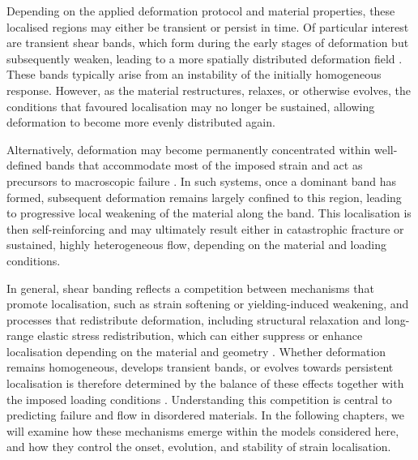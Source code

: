 Depending on the applied deformation protocol and material properties, these localised regions may either be transient or persist in time. Of particular interest are transient shear bands, which form during the early stages of deformation but subsequently weaken, leading to a more spatially distributed deformation field \cite{moorcroft_age-dependent_2011,barlow_ductile_2020,divouxTransientShearBanding2010,adams_transient_2011}. These bands typically arise from an instability of the initially homogeneous response. However, as the material restructures, relaxes, or otherwise evolves, the conditions that favoured localisation may no longer be sustained, allowing deformation to become more evenly distributed again.

Alternatively, deformation may become permanently concentrated within well-defined bands that accommodate most of the imposed strain and act as precursors to macroscopic failure \cite{greer_shear_2013,hufnagel_deformation_2016,nicolas_deformation_2018,Falk2003,maloney_amorphous_2006,Shi2007,falk_deformation_2011,Barrat2011}. In such systems, once a dominant band has formed, subsequent deformation remains largely confined to this region, leading to progressive local weakening of the material along the band. This localisation is then self-reinforcing and may ultimately result either in catastrophic fracture or sustained, highly heterogeneous flow, depending on the material and loading conditions.

In general, shear banding reflects a competition between mechanisms that promote localisation, such as strain softening or yielding-induced weakening, and processes that redistribute deformation, including structural relaxation and long-range elastic stress redistribution, which can either suppress or enhance localisation depending on the material and geometry \cite{fielding_shear_2014,divouxShearBandingComplex2016,martens_spontaneous_2012,moorcroft_criteria_2013,moorcroft_age-dependent_2011,nicolas_deformation_2018}. Whether deformation remains homogeneous, develops transient bands, or evolves towards persistent localisation is therefore determined by the balance of these effects together with the imposed loading conditions \cite{fielding_shear_2014,divouxShearBandingComplex2016}. Understanding this competition is central to predicting failure and flow in disordered materials. In the following chapters, we will examine how these mechanisms emerge within the models considered here, and how they control the onset, evolution, and stability of strain localisation.

